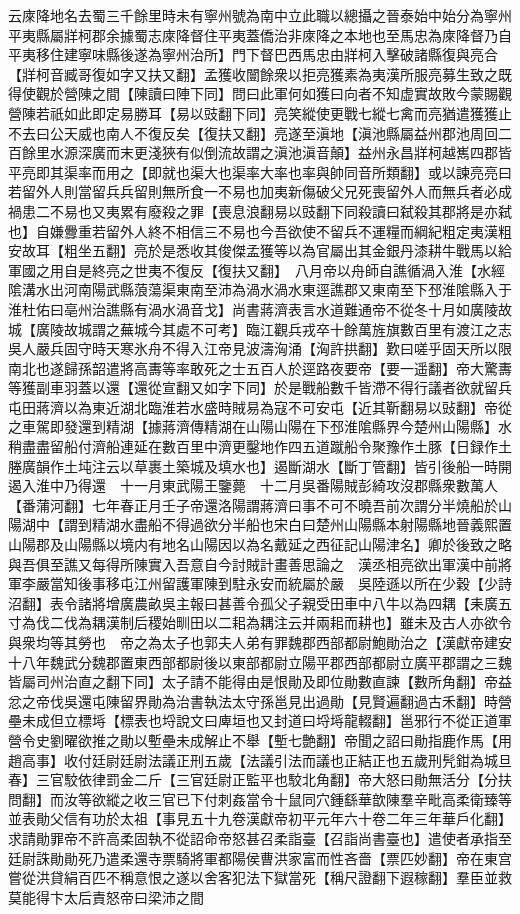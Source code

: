 云庲降地名去蜀三千餘里時未有寧州號為南中立此職以總攝之晉泰始中始分為寧州平夷縣屬牂柯郡余據蜀志庲降督住平夷蓋僑治非庲降之本地也至馬忠為庲降督乃自平夷移住建寧味縣後遂為寧州治所】門下督巴西馬忠由牂柯入擊破諸縣復與亮合【牂柯音臧哥復如字又扶又翻】孟獲收闓餘衆以拒亮獲素為夷漢所服亮募生致之既得使觀於營陳之間【陳讀曰陣下同】問曰此軍何如獲曰向者不知虚實故敗今蒙賜觀營陳若祇如此即定易勝耳【易以豉翻下同】亮笑縱使更戰七縱七禽而亮猶遣獲獲止不去曰公天威也南人不復反矣【復扶又翻】亮遂至滇地【滇池縣屬益州郡池周回二百餘里水源深廣而末更淺狹有似倒流故謂之滇池滇音顛】益州永昌牂柯越嶲四郡皆平亮即其渠率而用之【即就也渠大也渠率大率也率與帥同音所類翻】或以諫亮亮曰若留外人則當留兵兵留則無所食一不易也加夷新傷破父兄死喪留外人而無兵者必成禍患二不易也又夷累有廢殺之罪【喪息浪翻易以豉翻下同殺讀曰弑殺其郡將是亦弑也】自嫌釁重若留外人終不相信三不易也今吾欲使不留兵不運糧而綱紀粗定夷漢粗安故耳【粗坐五翻】亮於是悉收其俊傑孟獲等以為官屬出其金銀丹漆耕牛戰馬以給軍國之用自是終亮之世夷不復反【復扶又翻】　八月帝以舟師自譙循渦入淮【水經隂溝水出河南陽武縣蒗蕩渠東南至沛為渦水渦水東逕譙郡又東南至下邳淮隂縣入于淮杜佑曰亳州治譙縣有渦水渦音戈】尚書蔣濟表言水道難通帝不從冬十月如廣陵故城【廣陵故城謂之蕪城今其處不可考】臨江觀兵戎卒十餘萬旌旗數百里有渡江之志吳人嚴兵固守時天寒氷舟不得入江帝見波濤洶涌【洶許拱翻】歎曰嗟乎固天所以限南北也遂歸孫韶遣將高夀等率敢死之士五百人於逕路夜要帝【要一遥翻】帝大驚夀等獲副車羽蓋以還【還從宣翻又如字下同】於是戰船數千皆滯不得行議者欲就留兵屯田蔣濟以為東近湖北臨淮若水盛時賊易為寇不可安屯【近其靳翻易以䜴翻】帝從之車駕即發還到精湖【據蔣濟傳精湖在山陽山陽在下邳淮隂縣界今楚州山陽縣】水稍盡盡留船付濟船連延在數百里中濟更鑿地作四五道蹴船令聚豫作土豚【日録作土塍廣韻作土坉注云以草裹土築城及填水也】遏斷湖水【斷丁管翻】皆引後船一時開遏入淮中乃得還　十一月東武陽王鑒薨　十二月吳番陽賊彭綺攻沒郡縣衆數萬人【番蒲河翻】七年春正月壬子帝還洛陽謂蔣濟曰事不可不曉吾前次謂分半燒船於山陽湖中【謂到精湖水盡船不得過欲分半船也宋白曰楚州山陽縣本射陽縣地晉義熙置山陽郡及山陽縣以境内有地名山陽因以為名戴延之西征記山陽津名】卿於後致之略與吾俱至譙又每得所陳實入吾意自今討賊計畫善思論之　漢丞相亮欲出軍漢中前將軍李嚴當知後事移屯江州留護軍陳到駐永安而統屬於嚴　吳陸遜以所在少穀【少詩沼翻】表令諸將增廣農畝吳主報曰甚善令孤父子親受田車中八牛以為四耦【耒廣五寸為伐二伐為耦漢制后稷始甽田以二耜為耦注云并兩耜而耕也】雖未及古人亦欲令與衆均等其勞也　帝之為太子也郭夫人弟有罪魏郡西部都尉鮑勛治之【漢獻帝建安十八年魏武分魏郡置東西部都尉後以東部都尉立陽平郡西部都尉立廣平郡謂之三魏皆屬司州治直之翻下同】太子請不能得由是恨勛及即位勛數直諫【數所角翻】帝益忿之帝伐吳還屯陳留界勛為治書執法太守孫邕見出過勛【見賢遍翻過古禾翻】時營壘未成但立標埓【標表也埒說文曰庳垣也又封道曰埒埓龍輟翻】邕邪行不從正道軍營令史劉曜欲推之勛以塹壘未成解止不舉【塹七艶翻】帝聞之詔曰勛指鹿作馬【用趙高事】收付廷尉廷尉法議正刑五歲【法議引法而議也正結正也五歲刑髠鉗為城旦春】三官駮依律罰金二斤【三官廷尉正監平也駮北角翻】帝大怒曰勛無活分【分扶問翻】而汝等欲縱之收三官已下付刺姦當令十鼠同穴鍾繇華歆陳羣辛毗高柔衛臻等並表勛父信有功於太祖【事見五十九卷漢獻帝初平元年六十卷二年三年華戶化翻】求請勛罪帝不許高柔固執不從詔命帝怒甚召柔詣臺【召詣尚書臺也】遣使者承指至廷尉誅勛勛死乃遣柔還寺票騎將軍都陽侯曹洪家富而性吝嗇【票匹妙翻】帝在東宫嘗從洪貸絹百匹不稱意恨之遂以舍客犯法下獄當死【稱尺證翻下遐稼翻】羣臣並救莫能得卞太后責怒帝曰梁沛之間
